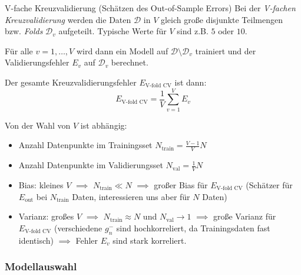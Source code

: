 \begin{defi}{V-fache Kreuzvalidierung (Schätzen des Out-of-Sample Errors)}
    Bei der \emph{V-fachen Kreuzvalidierung} werden die Daten $\mathcal{D}$ in $V$ gleich große disjunkte Teilmengen bzw. \emph{Folds} $\mathcal{D}_v$ aufgeteilt.
    Typische Werte für $V$ sind z.B. $5$ oder $10$.

    Für alle $v = 1, \ldots, V$ wird dann ein Modell auf $\mathcal{D} \setminus \mathcal{D}_v$ trainiert und der Validierungsfehler $E_v$ auf $\mathcal{D}_v$ berechnet.

    Der gesamte Kreuzvalidierungsfehler $E_\text{V-fold CV}$ ist dann:
    \[
        E_\text{V-fold CV} = \frac{1}{V} \sum_{v=1}^V E_v
    \]

    Von der Wahl von $V$ ist abhängig:
    \begin{itemize}
        \item Anzahl Datenpunkte im Trainingsset $N_\text{train} = \frac{V-1}{V} N$
        \item Anzahl Datenpunkte im Validierungsset $N_\text{val} = \frac{1}{V} N$
        \item Bias:
              \subitem kleines $V$
              \subitem $\implies$ $N_\text{train} \ll N$
              \subitem $\implies$ großer Bias für $E_\text{V-fold CV}$
              \subitem (Schätzer für $E_\text{out}$ bei $N_\text{train}$ Daten, interessieren uns aber für $N$ Daten)
        \item Varianz:
              \subitem großes $V$
              \subitem $\implies$ $N_\text{train} \approx N$ und $N_\text{val} \to 1$
              \subitem $\implies$ große Varianz für $E_\text{V-fold CV}$
              \subitem (verschiedene $g^{-}_n$ sind hochkorreliert, da Trainingsdaten fast identisch)
              \subitem $\implies$ Fehler $E_v$ sind stark korreliert.
    \end{itemize}
\end{defi}

\subsubsection{Modellauswahl}

